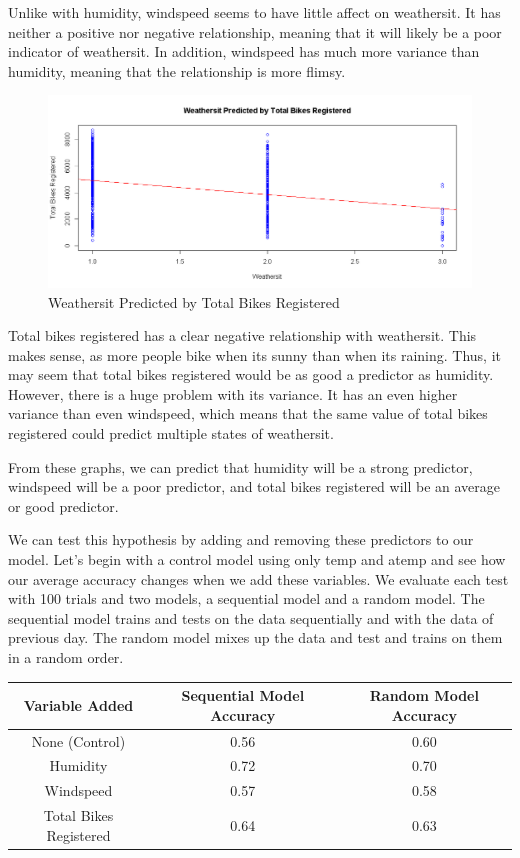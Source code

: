 \documentclass[12pt]{article}
\begin{document}
Unlike with humidity, windspeed seems to have little affect on weathersit. It has neither a positive nor negative relationship, meaning that it will likely be a poor indicator of weathersit. In addition, windspeed has much more variance than humidity, meaning that the relationship is more flimsy.

\begin{figure}[H]
	\centering
  	\includegraphics[width=150mm]{"Weathersit Predicted by Total Bikes Registered"}
 	\caption{Weathersit Predicted by Total Bikes Registered}
 	\label{Weathersit Predicted by Total Bikes Registered}
\end{figure}

Total bikes registered has a clear negative relationship with weathersit. This makes sense, as more people bike when its sunny than when its raining. Thus, it may seem that total bikes registered would be as good a predictor as humidity. However, there is a huge problem with its variance. It has an even higher variance than even windspeed, which means that the same value of total bikes registered could predict multiple states of weathersit.

From these graphs, we can predict that humidity will be a strong predictor, windspeed will be a poor predictor, and total bikes registered will be an average or good predictor. 

We can test this hypothesis by adding and removing these predictors to our model. Let's begin with a control model using only temp and atemp and see how our average accuracy changes when we add these variables. We evaluate each test with 100 trials and two models, a sequential model and a random model. The sequential model trains and tests on the data sequentially and with the data of previous day. The random model mixes up the data and test and trains on them in a random order.

\begin{table}[H]
\centering
 \begin{tabular}{||c | c c||} 
 \hline
 Variable Added & Sequential Model Accuracy & Random Model Accuracy \\ [0.5ex] 
 \hline\hline
 None (Control) & 0.56 & 0.60 \\ 
 Humidity & 0.72 & 0.70 \\
 Windspeed & 0.57 & 0.58 \\
 Total Bikes Registered & 0.64 & 0.63  \\ [1ex] 
 \hline
 \end{tabular}
\end{table}
\end{document}
